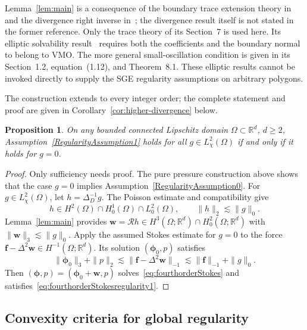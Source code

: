 \documentclass[10pt]{amsart}
\newtheorem{proposition}[theorem]{Proposition}
\numberwithin{equation}{section}
\begin{document}
Lemma~\ref{lem:main} is a consequence of the boundary trace extension theory in~\cite{MazyaMitreaShaposhnikova2010} and the divergence right inverse in~\cite{CostabelMcIntosh2010}; the divergence result itself is not stated in the former reference. Only the trace theory of its Section~7 is used here. Its elliptic solvability result~\cite[Theorem~1.1]{MazyaMitreaShaposhnikova2010} requires both the coefficients and the boundary normal to belong to VMO. The more general small-oscillation condition is given in its Section~1.2, equation~(1.12), and Theorem~8.1. These elliptic results cannot be invoked directly to supply the SGE regularity assumptions on arbitrary polygons.

The construction extends to every integer order; the complete statement and proof are given in Corollary~\ref{cor:higher-divergence} below.

\begin{proposition}\label{prop:homogeneous-stokes}
On any bounded connected Lipschitz domain $\Omega\subset\mathbb R^d$, $d\geq2$, Assumption~\ref{RegularityAssumption1} holds for all $g\in L^2_\chi(\Omega)$ if and only if it holds for $g=0$.
\end{proposition}
\begin{proof}
Only sufficiency needs proof. The pure pressure construction above shows that the case $g=0$ implies Assumption~\ref{RegularityAssumption0}. For $g\in L^2_\chi(\Omega)$, let $h=\Delta_D^{-1}g$. The Poisson estimate and compatibility give
\[
h\in H^2(\Omega)\cap H_0^1(\Omega)\cap L_0^2(\Omega),\qquad\|h\|_2\lesssim\|g\|_0.
\]
Lemma~\ref{lem:main} provides $\boldsymbol w=\mathcal Rh\in H^3(\Omega;\mathbb R^d)\cap H_0^2(\Omega;\mathbb R^d)$ with $\|\boldsymbol w\|_3\lesssim\|g\|_0$. Apply the assumed Stokes estimate for $g=0$ to the force $\boldsymbol f-\Delta^2\boldsymbol w\in H^{-1}(\Omega;\mathbb R^d)$. Its solution $(\boldsymbol\phi_0,p)$ satisfies
\[
\|\boldsymbol\phi_0\|_3+\|p\|_2\lesssim\|\boldsymbol f-\Delta^2\boldsymbol w\|_{-1}\lesssim\|\boldsymbol f\|_{-1}+\|g\|_0.
\]
Then $(\boldsymbol\phi,p)=(\boldsymbol\phi_0+\boldsymbol w,p)$ solves~\eqref{eq:fourthorderStokes} and satisfies~\eqref{eq:fourthorderStokesregularity1}.
\end{proof}

\subsection{Convexity criteria for global regularity}
\end{document}
